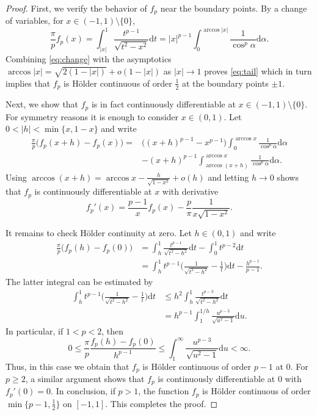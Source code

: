 \documentclass[10pt,a4paper]{amsart}
\newcommand{\dd}{\mathrm{d}}
\begin{document}
\begin{proof}
First, we verify the behavior of $f_p$ near the boundary points. By a change of variables, for $x\in (-1,1)\setminus\{0\}$, 
\begin{equation} \label{eq:change}
\frac{\pi}{p}f_p(x)
=\int_{|x|}^1 \frac{t^{p-1}}{\sqrt{t^2-x^2}}\dd t
=|x|^{p-1}\int_0^{\arccos |x|}\frac{1}{\cos^p \alpha}\dd \alpha.
\end{equation}
Combining \eqref{eq:change} with the asymptotics $\arccos |x|=\sqrt{2(1-|x|)}+o(1-|x|)$ as $|x|\to 1$ proves \eqref{eq:tail} which in turn implies that $f_p$ is Hölder continuous of order $\frac{1}{2}$ at the boundary points $\pm 1$.

Next, we show that $f_p$ is in fact continuously differentiable at $x\in (-1,1)\setminus \{0\}$. For symmetry reasons it is enough to consider $x\in (0,1)$. Let $0<|h|<\min\{x,1-x\}$ and write 
\begin{align*}
\frac{\pi}{p}\big(f_p(x+h)-f_p(x)\big)	
=&\big((x+h)^{p-1}-x^{p-1}\big)\int_0^{\arccos x}\frac{1}{\cos^p\alpha}\dd\alpha\\
&-(x+h)^{p-1}\int_{\arccos(x+h)}^{\arccos x}\frac{1}{\cos^p \alpha}\dd \alpha.
\end{align*}
Using $\arccos(x+h)=\arccos x -\frac{h}{\sqrt{1-x^2}}+o(h)$ and letting $h\to 0$ shows that $f_p$ is continuously differentiable at $x$ with derivative
\[
f_p'(x)
=\frac{p-1}{x}f_p(x)-\frac{p}{\pi}\frac{1}{x\sqrt{1-x^2}}.
\]

It remains to check Hölder continuity at zero. Let $h\in (0,1)$ and write
\begin{align*}
\frac{\pi}{p}\big(f_p(h)-f_p(0)\big)
&=\int_h^1 \frac{t^{p-1}}{\sqrt{t^2-h^2}}\dd t - \int_0^1 t^{p-2}\dd t\\
&=\int_h^1 t^{p-1}\Big(\frac{1}{\sqrt{t^2-h^2}}-\frac{1}{t}\Big)\dd t -\frac{h^{p-1}}{p-1}.
\end{align*}
The latter integral can be estimated by
\begin{align*}
\int_h^1 t^{p-1}\Big(\frac{1}{\sqrt{t^2-h^2}}-\frac{1}{t}\Big)\dd t
&\le h^2\int_h^1 \frac{t^{p-3}}{\sqrt{t^2-h^2}}\dd t\\
&= h^{p-1}\int_1^{1/h} \frac{u^{p-3}}{\sqrt{u^2-1}}\dd u.
\end{align*}
In particular, if $1< p<2$, then
\begin{equation} \label{eq:hoelder}
0\le \frac{\pi}{p}\frac{f_p(h)-f_p(0)}{h^{p-1}}
\le \int_1^{\infty} \frac{u^{p-3}}{\sqrt{u^2-1}}\dd u
<\infty.
\end{equation}
Thus, in this case we obtain that $f_p$ is Hölder continuous of order $p-1$ at $0$. For $p\ge 2$, a similar argument shows that $f_p$ is continuously differentiable at $0$ with $f_p'(0)=0$. In conclusion, if $p>1$, the function $f_p$ is Hölder continuous of order $\min\{p-1,\frac{1}{2}\}$ on $[-1,1]$. This completes the proof.
\end{proof}
\end{document}
